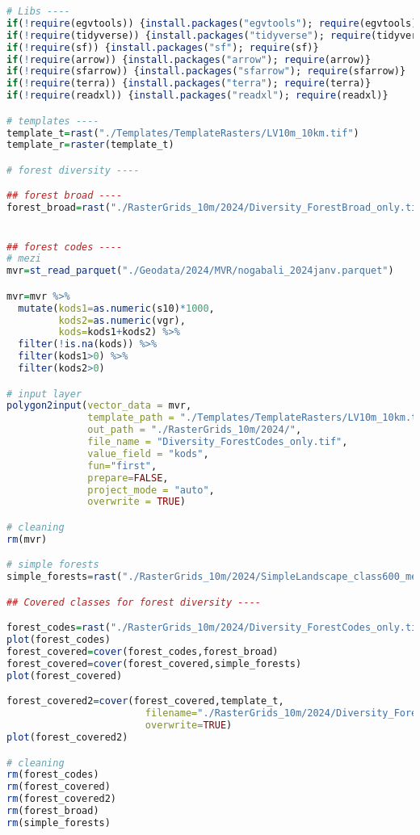 \documentclass[
]{book}
\begin{document}
\begin{lstlisting}[language=R]
# Libs ----
if(!require(egvtools)) {install.packages("egvtools"); require(egvtools)}
if(!require(tidyverse)) {install.packages("tidyverse"); require(tidyverse)}
if(!require(sf)) {install.packages("sf"); require(sf)}
if(!require(arrow)) {install.packages("arrow"); require(arrow)}
if(!require(sfarrow)) {install.packages("sfarrow"); require(sfarrow)}
if(!require(terra)) {install.packages("terra"); require(terra)}
if(!require(readxl)) {install.packages("readxl"); require(readxl)}

# templates ----
template_t=rast("./Templates/TemplateRasters/LV10m_10km.tif")
template_r=raster(template_t)

# forest diversity ----

## forest broad ----
forest_broad=rast("./RasterGrids_10m/2024/Diversity_ForestBroad_only.tif")


## forest codes ----
# mezi
mvr=st_read_parquet("./Geodata/2024/MVR/nogabali_2024janv.parquet")

mvr=mvr %>% 
  mutate(kods1=as.numeric(s10)*1000,
         kods2=as.numeric(vgr),
         kods=kods1+kods2) %>% 
  filter(!is.na(kods)) %>% 
  filter(kods1>0) %>% 
  filter(kods2>0)

# input layer
polygon2input(vector_data = mvr,
              template_path = "./Templates/TemplateRasters/LV10m_10km.tif",
              out_path = "./RasterGrids_10m/2024/",
              file_name = "Diversity_ForestCodes_only.tif",
              value_field = "kods",
              fun="first",
              prepare=FALSE,
              project_mode = "auto",
              overwrite = TRUE)

# cleaning
rm(mvr)

# simple forests
simple_forests=rast("./RasterGrids_10m/2024/SimpleLandscape_class600_meziem_premask.tif")

## Covered classes for forest diversity ----

forest_codes=rast("./RasterGrids_10m/2024/Diversity_ForestCodes_only.tif")
plot(forest_codes)
forest_covered=cover(forest_codes,forest_broad)
forest_covered=cover(forest_covered,simple_forests)
plot(forest_covered)

forest_covered2=cover(forest_covered,template_t,
                        filename="./RasterGrids_10m/2024/Diversity_ForestsDetailed.tif",
                        overwrite=TRUE)
plot(forest_covered2)

# cleaning
rm(forest_codes)
rm(forest_covered)
rm(forest_covered2)
rm(forest_broad)
rm(simple_forests)




\end{lstlisting}
\end{document}
